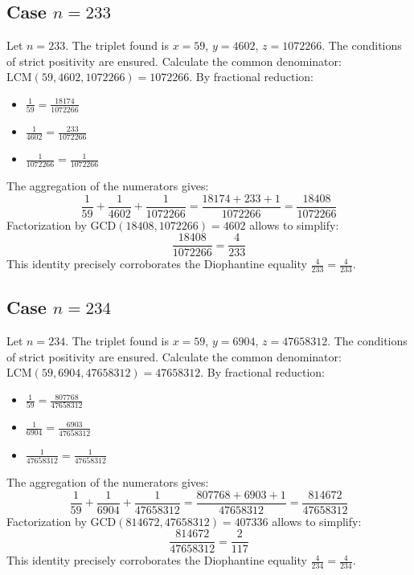 \documentclass[11pt,a4paper]{article}
\begin{document}
\subsection{Case $n = 233$}
Let $n = 233$. The triplet found is $x = 59$, $y = 4602$, $z = 1072266$.
The conditions of strict positivity are ensured.
Calculate the common denominator: $\text{LCM}(59, 4602, 1072266) = 1072266$.
By fractional reduction:
\begin{itemize}
    \item $\frac{1}{59} = \frac{18174}{1072266}$
    \item $\frac{1}{4602} = \frac{233}{1072266}$
    \item $\frac{1}{1072266} = \frac{1}{1072266}$
\end{itemize}
The aggregation of the numerators gives:
$$ \frac{1}{59} + \frac{1}{4602} + \frac{1}{1072266} = \frac{18174 + 233 + 1}{1072266} = \frac{18408}{1072266} $$
Factorization by $\text{GCD}(18408, 1072266) = 4602$ allows to simplify:
$$ \frac{18408}{1072266} = \frac{4}{233} $$
This identity precisely corroborates the Diophantine equality $\frac{4}{233} = \frac{4}{233}$.

\subsection{Case $n = 234$}
Let $n = 234$. The triplet found is $x = 59$, $y = 6904$, $z = 47658312$.
The conditions of strict positivity are ensured.
Calculate the common denominator: $\text{LCM}(59, 6904, 47658312) = 47658312$.
By fractional reduction:
\begin{itemize}
    \item $\frac{1}{59} = \frac{807768}{47658312}$
    \item $\frac{1}{6904} = \frac{6903}{47658312}$
    \item $\frac{1}{47658312} = \frac{1}{47658312}$
\end{itemize}
The aggregation of the numerators gives:
$$ \frac{1}{59} + \frac{1}{6904} + \frac{1}{47658312} = \frac{807768 + 6903 + 1}{47658312} = \frac{814672}{47658312} $$
Factorization by $\text{GCD}(814672, 47658312) = 407336$ allows to simplify:
$$ \frac{814672}{47658312} = \frac{2}{117} $$
This identity precisely corroborates the Diophantine equality $\frac{4}{234} = \frac{4}{234}$.
\end{document}
